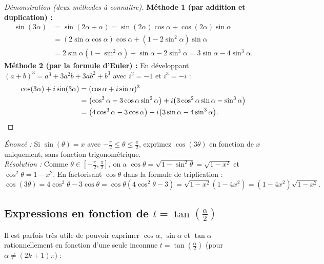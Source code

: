 \begin{proof}[Démonstration (deux méthodes à connaître)]
\textbf{Méthode 1 (par addition et duplication) :}
\begin{align*}
    \sin(3\alpha) &= \sin(2\alpha + \alpha) = \sin(2\alpha)\cos\alpha + \cos(2\alpha)\sin\alpha \\
    &= (2\sin\alpha\cos\alpha)\cos\alpha + (1 - 2\sin^2\alpha)\sin\alpha \\
    &= 2\sin\alpha(1 - \sin^2\alpha) + \sin\alpha - 2\sin^3\alpha = 3\sin\alpha - 4\sin^3\alpha.
\end{align*}
\textbf{Méthode 2 (par la formule d'Euler) :} En développant $(a+b)^3 = a^3 + 3a^2b + 3ab^2 + b^3$ avec $i^2 = -1$ et $i^3 = -i$ :
\begin{align*}
    \cos(3\alpha) + i\sin(3\alpha) &= (\cos\alpha + i\sin\alpha)^3 \\
    &= \bigl(\cos^3\alpha - 3\cos\alpha\sin^2\alpha\bigr) + i\bigl(3\cos^2\alpha\sin\alpha - \sin^3\alpha\bigr) \\
    &= \bigl(4\cos^3\alpha - 3\cos\alpha\bigr) + i\bigl(3\sin\alpha - 4\sin^3\alpha\bigr). \qedhere
\end{align*}
\end{proof}

\begin{exemple}
\emph{Énoncé :} Si $\sin(\theta) = x$ avec $-\frac{\pi}{2} \le \theta \le \frac{\pi}{2}$, exprimez $\cos(3\theta)$ en fonction de $x$ uniquement, sans fonction trigonométrique.\\
\emph{Résolution :} Comme $\theta \in [-\frac{\pi}{2}, \frac{\pi}{2}]$, on a $\cos\theta = \sqrt{1 - \sin^2\theta} = \sqrt{1-x^2}$ et $\cos^2\theta = 1-x^2$. En factorisant $\cos\theta$ dans la formule de triplication :
\[
    \cos(3\theta) = 4\cos^3\theta - 3\cos\theta = \cos\theta(4\cos^2\theta - 3) = \sqrt{1-x^2}(1 - 4x^2) = \boxed{(1 - 4x^2)\sqrt{1 - x^2}}.
\]
\end{exemple}

\subsection{Expressions en fonction de $t = \tan\left(\frac{\alpha}{2}\right)$}

Il est parfois très utile de pouvoir exprimer $\cos\alpha$, $\sin\alpha$ et $\tan\alpha$ rationnellement en fonction d'une seule inconnue $t = \tan\left(\frac{\alpha}{2}\right)$ (pour $\alpha \neq (2k+1)\pi$) :

